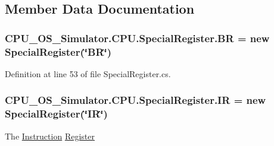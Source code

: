 \subsection{Member Data Documentation}
\hypertarget{class_c_p_u___o_s___simulator_1_1_c_p_u_1_1_special_register_a08c44f677cc5e830000382725ce8ab9f}{}
\subsubsection[{B\+R}]{ C\+P\+U\+\_\+\+O\+S\+\_\+\+Simulator.\+C\+P\+U.\+Special\+Register.\+B\+R = new {\bf Special\+Register}(\char`\"{}B\+R\char`\"{})\hspace{0.3cm}{\ttfamily [static]}}\label{class_c_p_u___o_s___simulator_1_1_c_p_u_1_1_special_register_a08c44f677cc5e830000382725ce8ab9f}






Definition at line 53 of file Special\+Register.\+cs.

\hypertarget{class_c_p_u___o_s___simulator_1_1_c_p_u_1_1_special_register_a96fde61578e06f00ab7b19a4b05b9885}{}
\subsubsection[{I\+R}]{ C\+P\+U\+\_\+\+O\+S\+\_\+\+Simulator.\+C\+P\+U.\+Special\+Register.\+I\+R = new {\bf Special\+Register}(\char`\"{}I\+R\char`\"{})\hspace{0.3cm}{\ttfamily [static]}}\label{class_c_p_u___o_s___simulator_1_1_c_p_u_1_1_special_register_a96fde61578e06f00ab7b19a4b05b9885}


The \hyperlink{class_c_p_u___o_s___simulator_1_1_c_p_u_1_1_instruction}{Instruction} \hyperlink{class_c_p_u___o_s___simulator_1_1_c_p_u_1_1_register}{Register} 



